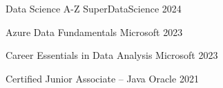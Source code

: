 

\begin{cvhonors}
	
\cvhonor
{Data Science A-Z} %
{SuperDataScience} %
{} %
{2024} %

	
\cvhonor
{Azure Data Fundamentals} %
{Microsoft} %
{} %
{2023} %


\cvhonor
{Career Essentials in Data Analysis} %
{Microsoft} %
{} %
{2023} %


\cvhonor
{Certified Junior Associate -- Java} %
{Oracle} %
{} %
{2021} %

	
\end{cvhonors}
